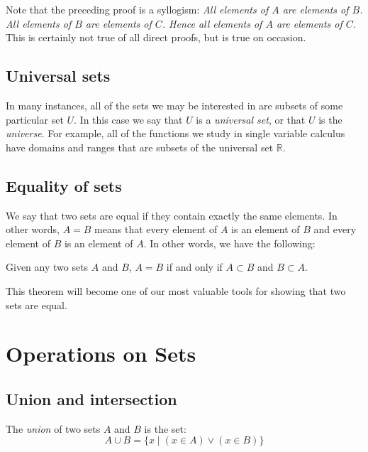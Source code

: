 Note that the preceding proof is a syllogism:  {\sl All elements of $A$ are elements of $B$.  All elements of $B$ are elements of $C$.  Hence all elements of $A$ are elements of $C$.\/}  This is certainly not true of all direct proofs, but is true on occasion.

\subsection{Universal sets}

In many instances, all of the sets we may be interested in are subsets of some particular set $U$.  In this case we say that $U$ is a \emph{universal set}, or that $U$ is the \emph{universe}.  For example, all of the functions we study in single variable calculus have domains and ranges that are subsets of the universal set $\mathbb R$.

\subsection{Equality of sets}

We say that two sets are equal if they contain exactly the same elements.  In other words, $A=B$ means that every element of $A$ is an element of $B$ and every element of $B$ is an element of $A$. In other words, we have the following:

\begin{thrm}\label{sets:equality}
Given any two sets $A$ and $B$, $A=B$ if and only if $A\subset B$ and $B\subset A$.
\end{thrm}

\noindent
This theorem will become one of our most valuable tools for showing that two sets are equal.

\section{Operations on Sets}

\subsection{Union and intersection}

\begin{definition}
The \emph{union} of two sets $A$ and $B$ is the set: \[ A\cup B=\{ x\mid (x\in A)\lor(x\in B)\}\]
\end{definition}

